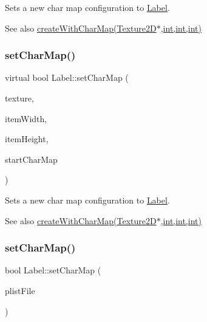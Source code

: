 Sets a new char map configuration to \hyperlink{classLabel}{Label}.

\begin{DoxySeeAlso}{See also}
{\ttfamily \hyperlink{classLabel_aea282c2c84fc975f7eb51af463f1d46b}{create\+With\+Char\+Map(\+Texture2\+D$\ast$,int,int,int)}} 
\end{DoxySeeAlso}
\mbox{\label{classLabel_aae5c736cb6ee13752bde8390e96e75ff}} 
\subsubsection{\texorpdfstring{set\+Char\+Map()}{setCharMap()}\hspace{0.1cm}{\footnotesize\ttfamily [4/6]}}
{\footnotesize\ttfamily virtual bool Label\+::set\+Char\+Map (\begin{DoxyParamCaption}\item[{\hyperlink{classTexture2D}{Texture2D} $\ast$}]{texture,  }\item[{int}]{item\+Width,  }\item[{int}]{item\+Height,  }\item[{int}]{start\+Char\+Map }\end{DoxyParamCaption})\hspace{0.3cm}{\ttfamily [virtual]}}

Sets a new char map configuration to \hyperlink{classLabel}{Label}.

\begin{DoxySeeAlso}{See also}
{\ttfamily \hyperlink{classLabel_aea282c2c84fc975f7eb51af463f1d46b}{create\+With\+Char\+Map(\+Texture2\+D$\ast$,int,int,int)}} 
\end{DoxySeeAlso}
\mbox{\label{classLabel_a1ac1991e6d9948bae7498117acf4547f}} 
\subsubsection{\texorpdfstring{set\+Char\+Map()}{setCharMap()}\hspace{0.1cm}{\footnotesize\ttfamily [5/6]}}
{\footnotesize\ttfamily bool Label\+::set\+Char\+Map (\begin{DoxyParamCaption}\item[{const std\+::string \&}]{plist\+File }\end{DoxyParamCaption})\hspace{0.3cm}{\ttfamily [virtual]}}

